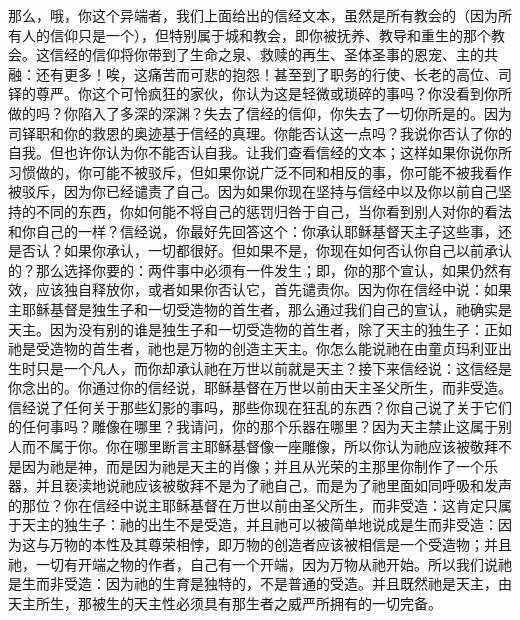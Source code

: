 那么，哦，你这个异端者，我们上面给出的信经文本，虽然是所有教会的（因为所有人的信仰只是一个），但特别属于城和教会，即你被抚养、教导和重生的那个教会。这信经的信仰将你带到了生命之泉、救赎的再生、圣体圣事的恩宠、主的共融：还有更多！唉，这痛苦而可悲的抱怨！甚至到了职务的行使、长老的高位、司铎的尊严。你这个可怜疯狂的家伙，你认为这是轻微或琐碎的事吗？你没看到你所做的吗？你陷入了多深的深渊？失去了信经的信仰，你失去了一切你所是的。因为司铎职和你的救恩的奥迹基于信经的真理。你能否认这一点吗？我说你否认了你的自我。但也许你认为你不能否认自我。让我们查看信经的文本；这样如果你说你所习惯做的，你可能不被驳斥，但如果你说广泛不同和相反的事，你可能不被我看作被驳斥，因为你已经谴责了自己。因为如果你现在坚持与信经中以及你以前自己坚持的不同的东西，你如何能不将自己的惩罚归咎于自己，当你看到别人对你的看法和你自己的一样？信经说，你最好先回答这个：你承认耶稣基督天主子这些事，还是否认？如果你承认，一切都很好。但如果不是，你现在如何否认你自己以前承认的？那么选择你要的：两件事中必须有一件发生；即，你的那个宣认，如果仍然有效，应该独自释放你，或者如果你否认它，首先谴责你。因为你在信经中说：如果主耶稣基督是独生子和一切受造物的首生者，那么通过我们自己的宣认，祂确实是天主。因为没有别的谁是独生子和一切受造物的首生者，除了天主的独生子：正如祂是受造物的首生者，祂也是万物的创造主天主。你怎么能说祂在由童贞玛利亚出生时只是一个凡人，而你却承认祂在万世以前就是天主？接下来信经说：这信经是你念出的。你通过你的信经说，耶稣基督在万世以前由天主圣父所生，而非受造。信经说了任何关于那些幻影的事吗，那些你现在狂乱的东西？你自己说了关于它们的任何事吗？雕像在哪里？我请问，你的那个乐器在哪里？因为天主禁止这属于别人而不属于你。你在哪里断言主耶稣基督像一座雕像，所以你认为祂应该被敬拜不是因为祂是神，而是因为祂是天主的肖像；并且从光荣的主那里你制作了一个乐器，并且亵渎地说祂应该被敬拜不是为了祂自己，而是为了祂里面如同呼吸和发声的那位？你在信经中说主耶稣基督在万世以前由圣父所生，而非受造：这肯定只属于天主的独生子：祂的出生不是受造，并且祂可以被简单地说成是生而非受造：因为这与万物的本性及其尊荣相悖，即万物的创造者应该被相信是一个受造物；并且祂，一切有开端之物的作者，自己有一个开端，因为万物从祂开始。所以我们说祂是生而非受造：因为祂的生育是独特的，不是普通的受造。并且既然祂是天主，由天主所生，那被生的天主性必须具有那生者之威严所拥有的一切完备。\par


